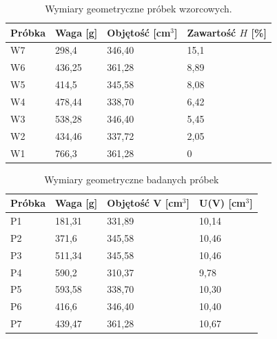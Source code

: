 \documentclass{article}
\begin{document}
\begin{table}[h!]
\centering
\label{wynikiW}
\caption{Wymiary geometryczne próbek wzorcowych.}
\begin{tabular}{|C{2cm}|C{2cm}|C{2cm}|C{2cm}|}\hline
	Próbka & Waga [g] & Objętość [cm$^3$] & Zawartość $H$ [\%] \\ \hline
		W7	&	298,4	&	346,40	&	15,1 \\ \hline
		W6	&	436,25	&	361,28	&	8,89 \\ \hline
		W5	&	414,5	&	345,58	&	8,08 \\ \hline
		W4	&	478,44	&	338,70	&	6,42 \\ \hline
		W3	&	538,28	&	346,40	&	5,45 \\ \hline
		W2	&	434,46	&	337,72	&	2,05 \\ \hline
		W1	&	766,3	&	361,28	&	0 \\ \hline

\end{tabular}
\end{table}

\begin{table}[h!]
\centering
\label{wynikiP}
\caption{Wymiary geometryczne badanych próbek}
\begin{tabular}{|C{2cm}|C{2cm}|C{2cm}|C{2cm}|}\hline
	Próbka & Waga [g] & Objętość V [cm$^3$] & U(V) [cm$^3$] \\ \hline
		P1	&	181,31	&	331,89	&	10,14 \\ \hline
		P2	&	371,6	&	345,58	&	10,46  \\ \hline
		P3	&	511,34	&	345,58	&	10,46 \\ \hline
		P4	&	590,2	&	310,37	&	9,78 \\ \hline
		P5	&	593,58	&	338,70	&	10,30 \\ \hline
		P6	&	416,6	&	346,40	&	10,40 \\ \hline
		P7	&	439,47	&	361,28	&	10,67 \\ \hline

\end{tabular}

\end{table}
\newpage
\end{document}
